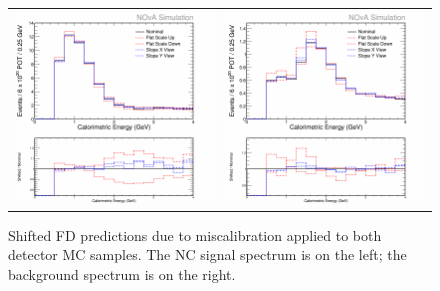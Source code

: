 \begin{figure}[p]
  \centering
  \begin{tabular}{c c}
    \includegraphics[width=.47\textwidth]{figures/Systs/cNCEXCalibAbsSysts.png} &
    \includegraphics[width=.47\textwidth]{figures/Systs/cBGEXCalibAbsSysts.png} \\
  \end{tabular}
  \caption[Shifted FD Predictions Due to Miscalibration at Both Detectors]{Shifted FD predictions due to miscalibration applied to both detector MC samples. The NC signal spectrum is on the left; the background spectrum is on the right.}
  \label{fig:SystCalibAbs}
\end{figure}

